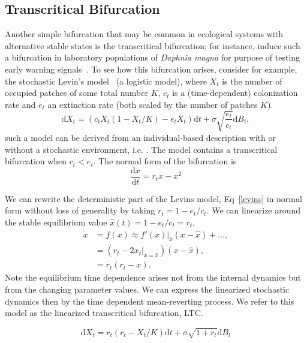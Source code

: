 \documentclass[authoryear, preprint,review,12pt]{elsarticle}
\newcommand{\ud}{\mathrm{d}}
\begin{document}
\subsection{Transcritical Bifurcation}
Another simple bifurcation that may be common in ecological systems with alternative stable states is the transcritical bifurcation; for instance, \citet{Drake2010} induce such a bifurcation in laboratory populations of \emph{Daphnia magna} for purpose of testing early warning signals~\citep{Drake2010}.  To see how this bifurcation arises, consider for example, the stochastic Levin's model~\citep{Levins1969} (a logistic model), where $X_t$ is the number of occupied patches of some total number $K$, $c_t$ is a (time-dependent) colonization rate and $e_t$ an extinction rate (both scaled by the number of patches $K$).  
\begin{equation}
\ud X_t = \left( c_t X_t (1-X_t/K) - e_t X_t \right) \ud t + \sigma \sqrt{\frac{e_t}{c_t}} \ud B_t \label{levins},
\end{equation}
such a model can be derived from an individual-based description with or without a stochastic environment, i.e.  \citep{Kampen2007a, Nisbet2004a}.  The model contains a transcritical bifurcation when $c_t < e_t$.  The normal form of the bifurcation is
\begin{equation}
\frac{\ud x}{\ud t} = r_t x - x^2 
\label{transcritical}
\end{equation}

We can rewrite the deterministic part of the Levins model, Eq~\ref{levins} in normal form without loss of generality by taking $r_t = 1 - e_t/c_t$.  
We can linearize around the stable equilibrium value $\hat x(t) = 1 - e_t/c_t = r_t$, 
\begin{align}
\dot x &=  f(x) \approx f'(x)|_{\hat x} (x - \hat x) + \ldots, \\
 &= (r_t - 2 x_t|_{x=\hat x}) (x - \hat x), \\
 &= r_t(r_t - x).
\end{align}
Note the equilibrium time dependence arises not from the internal dynamics but from the changing parameter values.  We can express the linearized stochastic dynamics then by the time dependent mean-reverting process.  We refer to this model as the linearized transcritical bifurcation, LTC.  

\begin{equation}
\ud X_t = r_t (r_t - X_t/K) \ud t + \sigma \sqrt{1+r_t} \ud B_t \label{LTC}
\end{equation}
\end{document}
